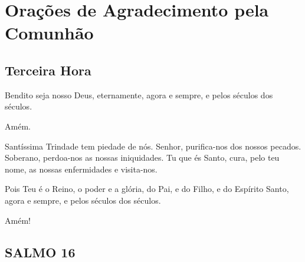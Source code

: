 \documentclass{subfiles}
\begin{document}
\chapter{Orações de Agradecimento pela Comunhão}

\section*{Terceira Hora}

\priest{}Bendito seja nosso Deus, eternamente, agora e sempre, e pelos
séculos dos séculos.

\reader{}Amém. \comforter{}

\trisagion{} \thrice{}

\Doxology{}

Santíssima Trindade tem piedade de nós. Senhor, purifica-nos dos
nossos pecados. Soberano, perdoa-nos as nossas iniquidades. Tu que és Santo,
cura, pelo teu nome, as nossas enfermidades e visita-nos.

\mercy{} \thrice{}

\Doxology{}

\ourFather{}

\priest{}Pois Teu é o Reino, o poder e a glória, do Pai, e do Filho, e do
Espírito Santo, agora e sempre, e pelos séculos dos séculos.

\reader{}Amém!

\mercy{} 

\Doxology{}


\section*{SALMO 16}
\end{document}

